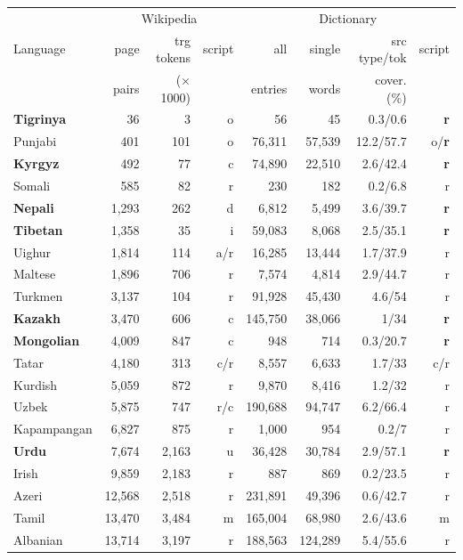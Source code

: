 \documentclass{article}
\begin{document}
\begin{table}[h!]
\setlength{\tabcolsep}{1ex}
\footnotesize
\begin{center}
\begin{tabular}{l|rrr|rrrr|}
\multicolumn{1}{c}{}	&	\multicolumn{3}{c}{Wikipedia}	&	\multicolumn{4}{c}{Dictionary}\\
\cline{2-8}%
Language	& page	&	trg tokens	&	script	&	all	&	single	& 	src type/tok	&	script \\
	&	pairs		& ($\times$ 1000)	&	&	entries	&	words	&	cover. (\%) &\\
\hline
{\bf Tigrinya}	&	36	&	3	&	o	&	56	&	45	&	0.3/0.6	&	{\bf r}\\
Punjabi 	&	401	&	101	&	o	&	76,311	&	57,539	&	12.2/57.7	&	o/{\bf r}\\ 	
\bf{Kyrgyz}	&	492	&	77	&	c	&	74,890	&	22,510	&	2.6/42.4	&	{\bf r}\\
Somali 	&	585	&	82	&	r	&	230	&	182	&	0.2/6.8	&	r\\ 
{\bf Nepali} 	&	1,293	&	262	&	d	&	6,812	&	5,499	&	3.6/39.7	&	{\bf r}\\
{\bf Tibetan}	&	1,358	&	35	&	i	&	59,083	&	8,068	&	2.5/35.1	&	{\bf r}\\
Uighur	&	1,814	&	114	&	a/r	&	16,285	&	13,444	&	1.7/37.9	&	r\\
Maltese 	&	1,896	&	706	&	r	&	7,574	&	4,814	&	2.9/44.7	&	r\\
Turkmen	&	3,137	&	104	&	r	&	91,928	&	45,430	&	4.6/54	&	r\\
{\bf Kazakh} 	&	3,470	&	606	&	c	&	145,750	&	38,066	&	1/34	&	{\bf r}\\
{\bf Mongolian} 	&	4,009	&	847	&	c	&	948	&	714	&	0.3/20.7	&	{\bf r}\\
Tatar		&	4,180	&	313	&	c/r	&	 8,557	&	6,633	&	1.7/33	&	c/r\\
Kurdish	&	5,059	&	872	&	r	&	9,870	&	8,416	&	1.2/32	&	r\\
Uzbek 	&	5,875	&	747	&	r/c	&	190,688	&	94,747	&	6.2/66.4	&	r\\
Kapampangan	&	6,827	&	875	&	r	&	1,000	&	954	&	0.2/7	&	r\\
{\bf Urdu} 	&	7,674	&	2,163	&	u	&	36,428	&	30,784	&	2.9/57.1	&	{\bf r}\\
Irish	&	9,859	&	2,183	&	r	&	887&	869	&	0.2/23.5	&	r\\
Azeri	&	12,568	&	2,518	&	r	&	231,891&	49,396	&	0.6/42.7	&	r\\
Tamil	&	13,470	&	3,484	&	m	&	165,004	&	68,980	&	2.6/43.6	&	m\\
Albanian 	&	13,714	&	3,197	&	r	&	188,563	&	124,289	&	5.4/55.6	&	r\\

\end{tabular}
\end{center}
\end{table}
\end{document}
